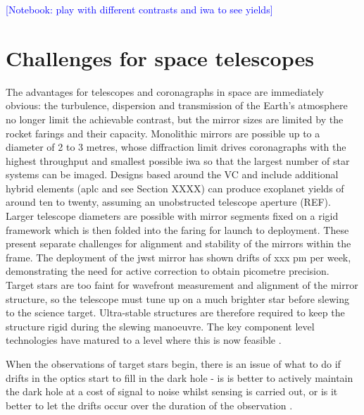 \documentclass[letterpaper]{ar-1col}
\newcommand{\notebooksuggestion}[1]{\textcolor{blue}{[Notebook: #1]}}
\begin{document}
\notebooksuggestion{play with different contrasts and \ac{iwa} to see yields}

\section{Challenges for space telescopes}

The advantages for telescopes and coronagraphs in space are immediately obvious: the turbulence, dispersion and transmission of the Earth's atmosphere no longer limit the achievable contrast, but the mirror sizes are limited by the rocket farings and their capacity.
%
Monolithic mirrors are possible up to a diameter of 2 to 3 metres, whose diffraction limit drives coronagraphs with the highest throughput and smallest possible \ac{iwa} so that the largest number of star systems can be imaged.
%
Designs based around the VC and include additional hybrid elements (\ac{aplc} and see Section XXXX) can produce exoplanet yields of around ten to twenty, assuming an unobstructed telescope aperture (REF).
%
Larger telescope diameters are possible with mirror segments fixed on a rigid framework which is then folded into the faring for launch to deployment.
%
These present separate challenges for alignment and stability of the mirrors within the frame.
%
The deployment of the \ac{jwst} mirror has shown drifts of xxx pm per week, demonstrating the need for active correction to obtain picometre precision.
%
Target stars are too faint for wavefront measurement and alignment of the mirror structure, so the telescope must tune up on a much brighter star before slewing to the science target.
%
Ultra-stable structures are therefore required to keep the structure rigid during the slewing manoeuvre.
%
The key component level technologies have matured to a level where this is now feasible \citep{Coyle21}.

When the observations of target stars begin, there is an issue of what to do if drifts in the optics start to fill in the dark hole - is is better to actively maintain the dark hole at a cost of signal to noise whilst sensing is carried out, or is it better to let the drifts occur over the duration of the observation \citep{Pogorelyuk19,Redmond20}.





\end{document}
